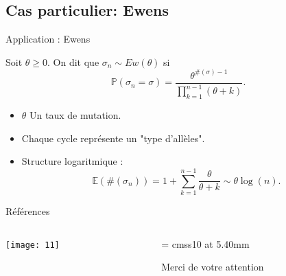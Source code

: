 \documentclass[french]{beamer}
\begin{document}
\subsection{Cas particulier: Ewens} 
\begin{frame}{Application : Ewens}
\begin{definition}
Soit $\theta\geq 0$. On dit que $\sigma_n\sim Ew(\theta)$ si  
\begin{equation*}
\mathbb{P}(\sigma_n=\sigma)=\frac{\theta^{\#(\sigma)-1}}{\prod_{k=1}^{n-1}(\theta+k)}.\end{equation*}
\end{definition}
\begin{itemize}
\item $\theta$ Un taux de mutation.
\item  Chaque cycle représente un "type d'allèles". 
\item Structure logaritmique : $$\mathbb{E}(\#(\sigma_n))= 1+\sum_{k=1}^{n-1} \frac{\theta}{\theta+k}\sim \theta \log(n).$$
\end{itemize}
\end{frame}
\begin{frame}{Références}
\tiny


    

\end{frame}
\begin{frame}

  \begin{columns}
    \begin{column}{0.70\textwidth}
      \begin{center}
        \texttt{[image: 11]}          
      \end{center}
    \end{column}
    \begin{column}{0.30\textwidth}
      \begin{center}

        \font\endfont = cmss10 at 5.40mm
\color[rgb]{0.00,0.00,1.00}       \endfont 
        \baselineskip 7.0mm

        Merci de votre attention

      \end{center}    

    \end{column}
  \end{columns}

\end{frame}
\end{document}
